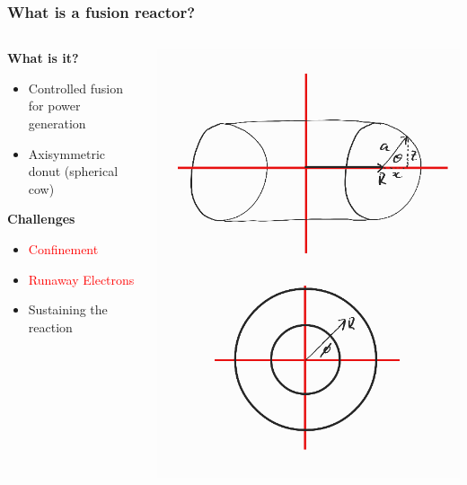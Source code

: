 \documentclass{beamer}
\begin{document}
\begin{frame}
\frametitle{What is a fusion reactor?}

\begin{columns}[T]

    \begin{column}{.5\textwidth}
        \textbf{What is it?}
        \begin{itemize}
            \item Controlled fusion for power generation
            \item Axisymmetric donut (spherical cow)
        \end{itemize}

        \textbf{Challenges}
        \begin{itemize}
            \item \textcolor{red}{Confinement}
            \item \textcolor{red}{Runaway Electrons}
            \item Sustaining the reaction
        \end{itemize}
    \end{column}

    \begin{column}{.5\textwidth}
        \includegraphics[scale=0.28]{imgs/dimensions.png}
    \end{column}


\end{columns}
\end{frame}
\end{document}
